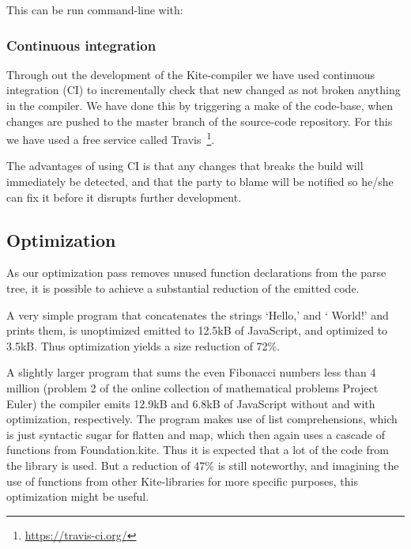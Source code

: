 This can be run command-line with: 

\subsubsection{Continuous integration}
Through out the development of the Kite-compiler we have used
continuous integration (CI) to incrementally check that new changed as
not broken anything in the compiler. We have done this by triggering a
make of the code-base, when changes are pushed to the master branch of
the source-code repository. For this we have used a free service
called Travis~\footnote{\url{https://travis-ci.org/}}.

The advantages of using CI is that any changes that breaks the build
will immediately be detected, and that the party to blame will be
notified so he/she can fix it before it disrupts further development.


\subsection{Optimization}
As our optimization pass removes unused function declarations from the parse tree, it is possible to achieve a substantial reduction of the emitted code.

A very simple program that concatenates the strings `Hello,' and ` World!' and prints them, is unoptimized emitted to 12.5kB of JavaScript, and optimized to 3.5kB. Thus optimization yields a size reduction of 72\%.

A slightly larger program that sums the even Fibonacci numbers less than 4 million (problem 2 of the online collection of mathematical problems Project Euler\cite{euler}) the compiler emits 12.9kB and 6.8kB of JavaScript without and with optimization, respectively. The program makes use of list comprehensions, which is just syntactic sugar for flatten and map, which then again uses a cascade of functions from Foundation.kite. Thus it is expected that a lot of the code from the library is used. But a reduction of 47\% is still noteworthy, and imagining the use of functions from other Kite-libraries for more specific purposes, this optimization might be useful.

